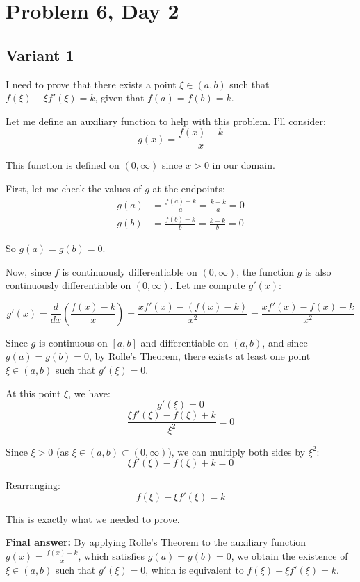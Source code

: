 \documentclass[12pt,a4paper]{article}
\theoremstyle{definition}
\begin{document}
\section{Problem 6, Day 2}
\subsection{Variant 1}
    I need to prove that there exists a point $\xi \in (a,b)$ such that $f(\xi) - \xi f'(\xi) = k$, given that $f(a) = f(b) = k$.

    Let me define an auxiliary function to help with this problem. I'll consider:
    $$g(x) = \frac{f(x) - k}{x}$$

    This function is defined on $(0,\infty)$ since $x > 0$ in our domain.

    First, let me check the values of $g$ at the endpoints:
    \begin{align}
        g(a) &= \frac{f(a) - k}{a} = \frac{k - k}{a} = 0\\
        g(b) &= \frac{f(b) - k}{b} = \frac{k - k}{b} = 0
    \end{align}

    So $g(a) = g(b) = 0$.

    Now, since $f$ is continuously differentiable on $(0,\infty)$, the function $g$ is also continuously differentiable on $(0,\infty)$. Let me compute $g'(x)$:

    $$g'(x) = \frac{d}{dx}\left(\frac{f(x) - k}{x}\right) = \frac{xf'(x) - (f(x) - k)}{x^2} = \frac{xf'(x) - f(x) + k}{x^2}$$

    Since $g$ is continuous on $[a,b]$ and differentiable on $(a,b)$, and since $g(a) = g(b) = 0$, by Rolle's Theorem, there exists at least one point $\xi \in (a,b)$ such that $g'(\xi) = 0$.

    At this point $\xi$, we have:
    $$g'(\xi) = 0$$
    $$\frac{\xi f'(\xi) - f(\xi) + k}{\xi^2} = 0$$

    Since $\xi > 0$ (as $\xi \in (a,b) \subset (0,\infty)$), we can multiply both sides by $\xi^2$:
    $$\xi f'(\xi) - f(\xi) + k = 0$$

    Rearranging:
    $$f(\xi) - \xi f'(\xi) = k$$

    This is exactly what we needed to prove.

    \textbf{Final answer:} By applying Rolle's Theorem to the auxiliary function $g(x) = \frac{f(x) - k}{x}$, which satisfies $g(a) = g(b) = 0$, we obtain the existence of $\xi \in (a,b)$ such that $g'(\xi) = 0$, which is equivalent to $f(\xi) - \xi f'(\xi) = k$.
\end{document}
